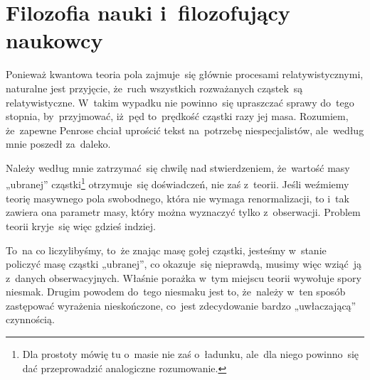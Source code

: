 \documentclass[a4paper,11pt]{article}
\begin{document}
\vspace{\spaceTwo}










\newpage
\section{Filozofia nauki i~filozofujący naukowcy}

\vspace{\spaceTwo}






\start {} Ponieważ kwantowa teoria pola zajmuje~się
głównie procesami relatywistycznymi, naturalne jest przyjęcie, że~ruch
wszystkich rozważanych cząstek~są relatywistyczne. W~takim wypadku nie
powinno~się upraszczać sprawy do~tego stopnia, by~przyjmować, iż~pęd
to~prędkość cząstki razy jej masa. Rozumiem, że~zapewne Penrose chciał
uprościć tekst na~potrzebę niespecjalistów, ale~według mnie poszedł
za~daleko.

\vspace{\spaceFour}


\start {} Należy według mnie zatrzymać~się chwilę nad
stwierdzeniem, że~wartość masy „ubranej” cząstki\footnote{Dla
  prostoty mówię tu o~masie nie zaś o~ładunku, ale~dla niego
  powinno~się dać przeprowadzić analogiczne rozumowanie.}
otrzymuje~się doświadczeń, nie zaś z~teorii. Jeśli weźmiemy teorię
masywnego pola swobodnego, która nie wymaga renormalizacji, to i~tak
zawiera ona parametr masy, który można wyznaczyć tylko z~obserwacji.
Problem teorii kryje~się więc gdzieś indziej.

To~na co liczylibyśmy, to~że znając masę gołej cząstki, jesteśmy
w~stanie policzyć masę cząstki „ubranej”, co okazuje~się nieprawdą,
musimy więc wziąć~ją z~danych obserwacyjnych. Właśnie porażka w~tym
miejscu teorii wywołuje spory niesmak. Drugim powodem do~tego niesmaku
jest to, że~należy w~ten sposób zastępować wyrażenia nieskończone,
co~jest zdecydowanie bardzo „uwłaczającą” czynnością.
\end{document}
